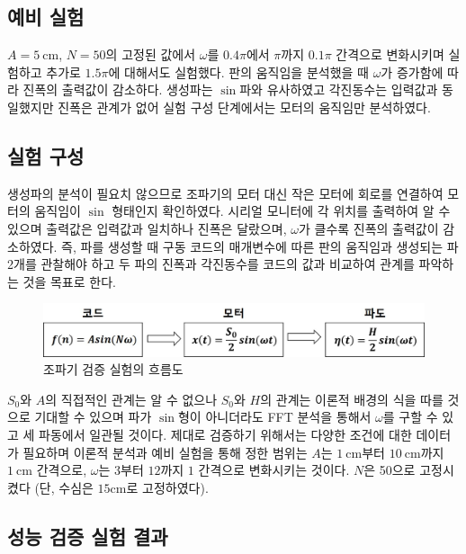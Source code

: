 \subsection{예비 실험}
$A = 5\mathrm{~cm}$, $N=50$의 고정된 값에서 $\omega$를 $0.4\pi$에서 $\pi$까지 $0.1\pi$ 간격으로 변화시키며 실험하고 추가로 $1.5\pi$에 대해서도 실험했다.
판의 움직임을 분석했을 때 $\omega$가 증가함에 따라 진폭의 출력값이 감소하다. 생성파는 $\sin$파와 유사하였고 각진동수는 입력값과 동일했지만 진폭은 관계가 없어 실험 구성 단계에서는 모터의 움직임만 분석하였다.

\subsection{실험 구성}
생성파의 분석이 필요치 않으므로 조파기의 모터 대신 작은 모터에 회로를 연결하여 모터의 움직임이 $\sin$ 형태인지 확인하였다. 시리얼 모니터에 각 위치를 출력하여 알 수 있으며 출력값은 입력값과 일치하나 진폭은 달랐으며, $\omega$가 클수록 진폭의 출력값이 감소하였다. 즉, 파를 생성할 때 구동 코드의 매개변수에 따른 판의 움직임과 생성되는 파 2개를 관찰해야 하고 두 파의 진폭과 각진동수를 코드의 값과 비교하여 관계를 파악하는 것을 목표로 한다.

\begin{figure}[H]
    \centering
    \includegraphics[width=12cm]{images/Flow_Chart(Analysis System_Kor).jpg}
    \caption{조파기 검증 실험의 흐름도}
    \label{Flow_Chart}
\end{figure}

$S_0$와 $A$의 직접적인 관계는 알 수 없으나 $S_0$와 $H$의 관계는 이론적 배경의 식을 따를 것으로 기대할 수 있으며 파가 $\sin$형이 아니더라도 FFT 분석을 통해서 $\omega$를 구할 수 있고 세 파동에서 일관될 것이다. 제대로 검증하기 위해서는 다양한 조건에 대한 데이터가 필요하며 이론적 분석과 예비 실험을 통해 정한 범위는 $A$는 $1\mathrm{~cm}$부터 $10\mathrm{~cm}$까지 $1\mathrm{~cm}$ 간격으로, $\omega$는 $3$부터 $12$까지 $1$ 간격으로 변화시키는 것이다. $N$은 50으로 고정시켰다 (단, 수심은 $15\mathrm{cm}$로 고정하였다).


\subsection{성능 검증 실험 결과}

